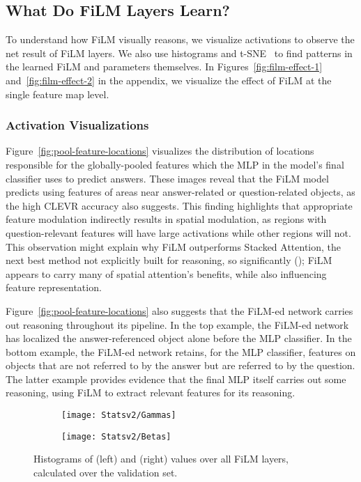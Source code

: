 \documentclass[letterpaper]{article} \usepackage{aaai18}  \usepackage{times}  \usepackage{helvet}  \usepackage{courier}  \usepackage{url}  \usepackage{graphicx}  \frenchspacing  \setlength{\pdfpagewidth}{8.5in}  \setlength{\pdfpageheight}{11in}
\begin{document}
	\subsection{What Do FiLM Layers Learn?} \label{what-is-learned}
        
        To understand how FiLM visually reasons, we visualize activations to observe the net result of FiLM layers. We also use histograms and t-SNE~\cite{maaten2008visualizing} to find patterns in the learned FiLM  and  parameters themselves. In Figures~\ref{fig:film-effect-1} and~\ref{fig:film-effect-2} in the appendix, we visualize the effect of FiLM at the single feature map level.
        
        \subsubsection{Activation Visualizations}
        Figure~\ref{fig:pool-feature-locations} visualizes the distribution of locations responsible for the globally-pooled features which the MLP in the model's final classifier uses to predict answers. These images reveal that the FiLM model predicts using features of areas near answer-related or question-related objects, as the high CLEVR accuracy also suggests. This finding highlights that appropriate feature modulation indirectly results in spatial modulation, as regions with question-relevant features will have large activations while other regions will not. This observation might explain why FiLM outperforms Stacked Attention, the next best method not explicitly built for reasoning, so significantly (); FiLM appears to carry many of spatial attention's benefits, while also influencing feature representation.
        
		Figure~\ref{fig:pool-feature-locations} also suggests that the FiLM-ed network carries out reasoning throughout its pipeline. In the top example, the FiLM-ed network has localized the answer-referenced object alone before the MLP classifier. In the bottom example, the FiLM-ed network retains, for the MLP classifier, features on objects that are not referred to by the answer but are referred to by the question. The latter example provides evidence that the final MLP itself carries out some reasoning, using FiLM to extract relevant features for its reasoning.
        
        \begin{figure}
          \begin{subfigure}[b]{0.23\textwidth}
              \texttt{[image: Statsv2/Gammas]}
          \end{subfigure}\begin{subfigure}[b]{0.23\textwidth}
              \texttt{[image: Statsv2/Betas]}
          \end{subfigure}\caption{Histograms of  (left) and  (right) values over all FiLM layers, calculated over the validation set.}
        \label{fig:gammas-betas}
        \end{figure}
        
\end{document}
